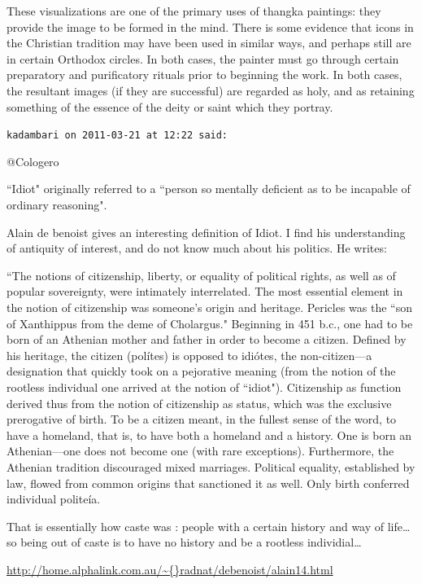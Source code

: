 \begin{footnotesize}
\begin{sffamily}
These visualizations are one of the primary uses of thangka paintings: they provide the image to be formed in the mind. There is some evidence that icons in the Christian tradition may have been used in similar ways, and perhaps still are in certain Orthodox circles. In both cases, the painter must go through certain preparatory and purificatory rituals prior to beginning the work. In both cases, the resultant images (if they are successful) are regarded as holy, and as retaining something of the essence of the deity or saint which they portray.


\hfill

\texttt{kadambari on 2011-03-21 at 12:22 said: }

@Cologero

``Idiot" originally referred to a ``person so mentally deficient as to be incapable of ordinary reasoning".

Alain de benoist gives an interesting definition of Idiot. I find his understanding of antiquity of interest, and do not know much about his politics. He writes:

``The notions of citizenship, liberty, or equality of political rights, as well as of popular sovereignty, were intimately interrelated. The most essential element in the notion of citizenship was someone's origin and heritage. Pericles was the ``son of Xanthippus from the deme of Cholargus." Beginning in 451 b.c., one had to be born of an Athenian mother and father in order to become a citizen. Defined by his heritage, the citizen (polítes) is opposed to idiótes, the non-citizen—a designation that quickly took on a pejorative meaning (from the notion of the rootless individual one arrived at the notion of ``idiot"). Citizenship as function derived thus from the notion of citizenship as status, which was the exclusive prerogative of birth. To be a citizen meant, in the fullest sense of the word, to have a homeland, that is, to have both a homeland and a history. One is born an Athenian—one does not become one (with rare exceptions). Furthermore, the Athenian tradition discouraged mixed marriages. Political equality, established by law, flowed from common origins that sanctioned it as well. Only birth conferred individual politeía.

That is essentially how caste was : people with a certain history and way of life…so being out of caste is to have no history and be a rootless individial…

\url{http://home.alphalink.com.au/\~{}radnat/debenoist/alain14.html}



\end{sffamily}
\end{footnotesize}
